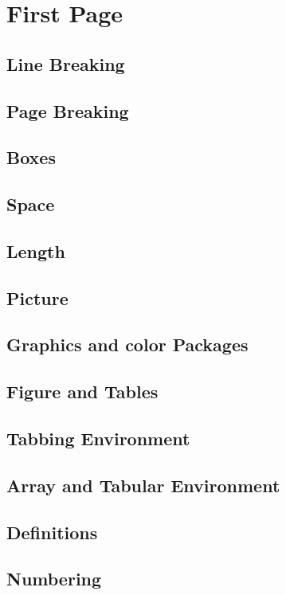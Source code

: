 \section{First Page}
\subsection{Line Breaking}
\subsection{Page Breaking}
\subsection{Boxes}
\subsection{Space}
\subsection{Length}
\subsection{Picture}
\subsection{Graphics and color Packages}
\subsection{Figure and Tables}
\subsection{Tabbing Environment}
\subsection{Array and Tabular Environment}
\subsection{Definitions}
\subsection{Numbering}
\newpage